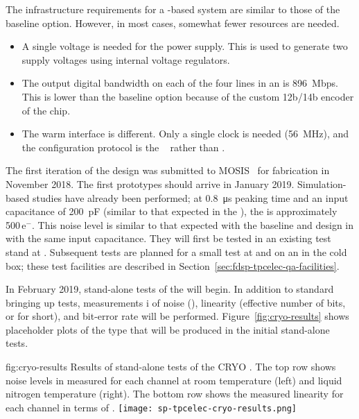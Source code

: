 The infrastructure requirements for a  -based 
system are similar to those of the baseline option. However, in most 
cases, somewhat fewer resources are needed.
\begin{itemize}
\item{A single voltage is needed for the power supply. This is used to 
generate two supply voltages using internal voltage regulators.}
\item{The output digital bandwidth on each of the four lines in an 
 is \SI{896}{Mbps}. This is lower than the baseline option 
because of the custom 12b/14b encoder of the  chip.}
\item{The warm interface is different. Only a single clock is 
needed (\SI{56}{MHz}), and the configuration protocol is the 
~\cite{SACI} rather than .}
\end{itemize}

The first iteration of the   design was 
submitted to MOSIS~\cite{mosis} for fabrication in November 2018.  
The first prototypes should arrive in January 2019. Simulation-based 
studies have already been performed; at \SI{0.8}{\micro\second} peaking 
time and an input capacitance of \SI{200}{pF} (similar to that expected 
in the  ), the  is approximately 
\num{500}\,e$^-$.  This noise level is similar to that expected with the 
baseline  and   design in  
with the same input capacitance.  They will first be tested in an existing 
test stand at . Subsequent tests are planned for a small test 
 at  and on an  in the  
cold box; these test facilities are described in 
Section~\ref{sec:fdsp-tpcelec-qa-facilities}.

In February 2019, stand-alone tests of the   
will begin. In addition to standard bringing up tests, measurements i
of noise (), linearity (effective number of bits, or  
for short), and bit-error rate will be performed. Figure~\ref{fig:cryo-results} 
shows placeholder plots of the type that will be produced in the initial 
stand-alone tests.

\begin{dunefigure}
{fig:cryo-results}
{Results of stand-alone tests of the CRYO . The top row shows 
noise levels in  measured for each channel at room temperature 
(left) and liquid nitrogen temperature (right). The bottom row shows the 
measured linearity for each channel in terms of .}
\texttt{[image: sp-tpcelec-cryo-results.png]}
\end{dunefigure}

